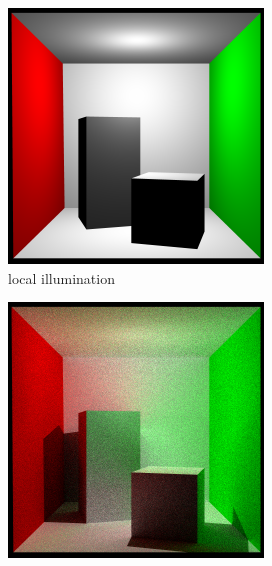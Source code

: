 \documentclass[a4paper, twocolumn]{article}
\begin{document}
    \begin{figure}[ht]
        \centering
        \label{fig:cornell_box}
        \begin{subfigure}{0.48\linewidth}
            \centering
            \label{fig:cornell_box_local_illumination}
            \includegraphics[width=\linewidth]{share/cornell_local_illumination.png}
            \caption{local illumination}
        \end{subfigure} \hfill
        \begin{subfigure}{0.48\linewidth}
            \centering
            \label{fig:cornell_box_global_illumination}
            \includegraphics[width=\linewidth]{share/cornell_global_illumination.png}

\end{subfigure}
\end{figure}
\end{document}
